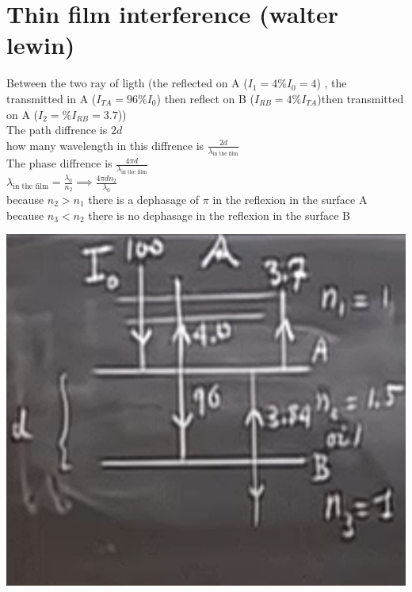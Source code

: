 \documentclass[12pt]{book}
\begin{document}
        \section{Thin film interference (walter lewin)}
            \begin{minipage}{0.59\linewidth}
                Between the two ray of ligth  {\scriptsize(the reflected on A ($I_{1}=4\%I_0 = 4$) , the transmitted in A ($ I_{TA} = 96\% I_0 $) then reflect on B ($ I_{RB} = 4\%I_{TA} $)then transmitted on A ($I_2 = \%I_{RB} = 3.7$))}\\
                The path diffrence is $2d$ \\
                how many wavelength in this diffrence is $ \frac{2d}{\lambda_{\text{in the film}}} $\\
                The phase diffrence is $ \frac{4\pi d}{\lambda_{\text{in the film}}} $ \\
                $ \lambda_{\text{in the film}} = \frac{\lambda_0}{n_{2}} \implies \frac{4\pi d n_2}{\lambda_0} $\\
                because $ n_2 > n_1 $ there is a dephasage of $ \pi $ in the reflexion in the surface A \\
                because $ n_3 < n_2 $ there is no dephasage in the reflexion in the surface B \\
            \end{minipage}
            \begin{minipage}{0.4\linewidth}
                \includegraphics[width=\linewidth]{pic/interference_walterlewin.png}
            \end{minipage}
\end{document}
